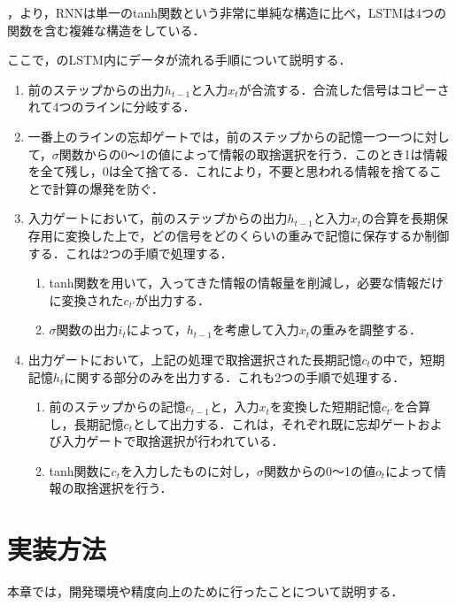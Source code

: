 \documentclass{eithesis}
\begin{document}
    ，より，RNNは単一のtanh関数という非常に単純な構造に比べ，LSTMは4つの関数を含む複雑な構造をしている．

    ここで，のLSTM内にデータが流れる手順について説明する．
    \begin{enumerate}
      \item 前のステップからの出力$h_{t-1}$と入力$x_t$が合流する．合流した信号はコピーされて4つのラインに分岐する．
      \item 一番上のラインの忘却ゲートでは，前のステップからの記憶一つ一つに対して，$\sigma$関数からの0〜1の値によって情報の取捨選択を行う．このとき1は情報を全て残し，0は全て捨てる．これにより，不要と思われる情報を捨てることで計算の爆発を防ぐ．
      \item 入力ゲートにおいて，前のステップからの出力$h_{t-1}$と入力$x_t$の合算を長期保存用に変換した上で，どの信号をどのくらいの重みで記憶に保存するか制御する．これは2つの手順で処理する．
        \begin{enumerate}
          \item tanh関数を用いて，入ってきた情報の情報量を削減し，必要な情報だけに変換された$c_{t'}$が出力する．
          \item $\sigma$関数の出力$i_t$によって，$h_{t-1}$を考慮して入力$x_t$の重みを調整する．
        \end{enumerate}
      \item 出力ゲートにおいて，上記の処理で取捨選択された長期記憶$c_t$の中で，短期記憶$h_t$に関する部分のみを出力する．これも2つの手順で処理する．
        \begin{enumerate}
          \item 前のステップからの記憶$c_{t-1}$と，入力$x_t$を変換した短期記憶$c_{t'}$を合算し，長期記憶$c_t$として出力する．これは，それぞれ既に忘却ゲートおよび入力ゲートで取捨選択が行われている．
          \item tanh関数に$c_t$を入力したものに対し，$\sigma$関数からの0〜1の値$o_t$によって情報の取捨選択を行う．
        \end{enumerate}
    \end{enumerate}

\chapter{実装方法}
  本章では，開発環境や精度向上のために行ったことについて説明する．
\end{document}
